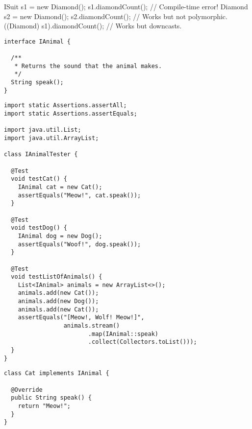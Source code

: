 \begin{verbnobox}[\small]
ISuit s1 = new Diamond();
s1.diamondCount();             // Compile-time error!
Diamond s2 = new Diamond();
s2.diamondCount();             // Works but not polymorphic.
((Diamond) s1).diamondCount(); // Works but downcasts.
\end{verbnobox}


\begin{lstlisting}[language=MyJava]
interface IAnimal {

  /**
   * Returns the sound that the animal makes.
   */
  String speak();
}
\end{lstlisting}

\begin{lstlisting}[language=MyJava]
import static Assertions.assertAll;
import static Assertions.assertEquals;

import java.util.List;
import java.util.ArrayList;

class IAnimalTester {
  
  @Test
  void testCat() {
    IAnimal cat = new Cat();
    assertEquals("Meow!", cat.speak());
  }

  @Test
  void testDog() {
    IAnimal dog = new Dog();
    assertEquals("Woof!", dog.speak());
  }

  @Test
  void testListOfAnimals() {
    List<IAnimal> animals = new ArrayList<>();
    animals.add(new Cat());
    animals.add(new Dog());
    animals.add(new Cat());
    assertEquals("[Meow!, Wolf! Meow!]", 
                 animals.stream()
                        .map(IAnimal::speak)
                        .collect(Collectors.toList()));
  }
}
\end{lstlisting}

\begin{lstlisting}[language=MyJava]
class Cat implements IAnimal {

  @Override
  public String speak() { 
    return "Meow!"; 
  }
}
\end{lstlisting}

